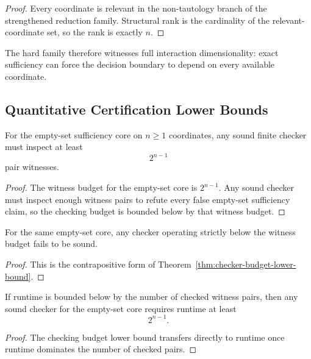 \begin{proof}
Every coordinate is relevant in the non-tautology branch of the strengthened reduction family. Structural rank is the cardinality of the relevant-coordinate set, so the rank is exactly $n$.
\end{proof}

The hard family therefore witnesses full interaction dimensionality: exact sufficiency can force the decision boundary to depend on every available coordinate.

\subsection{Quantitative Certification Lower Bounds}

\begin{theorem}\label{thm:checker-budget-lower-bound}
For the empty-set sufficiency core on $n \ge 1$ coordinates, any sound finite checker must inspect at least
\[
2^{n-1}
\]
pair witnesses.
\end{theorem}

\begin{proof}
The witness budget for the empty-set core is $2^{n-1}$. Any sound checker must inspect enough witness pairs to refute every false empty-set sufficiency claim, so the checking budget is bounded below by that witness budget.
\end{proof}

\begin{corollary}\label{cor:no-sound-checker-below-budget}
For the same empty-set core, any checker operating strictly below the witness budget fails to be sound.
\end{corollary}

\begin{proof}
This is the contrapositive form of Theorem~\ref{thm:checker-budget-lower-bound}.
\end{proof}

\begin{corollary}\label{cor:checking-time-lower-bound}
If runtime is bounded below by the number of checked witness pairs, then any sound checker for the empty-set core requires runtime at least
\[
2^{n-1}.
\]
\end{corollary}

\begin{proof}
The checking budget lower bound transfers directly to runtime once runtime dominates the number of checked pairs.
\end{proof}

